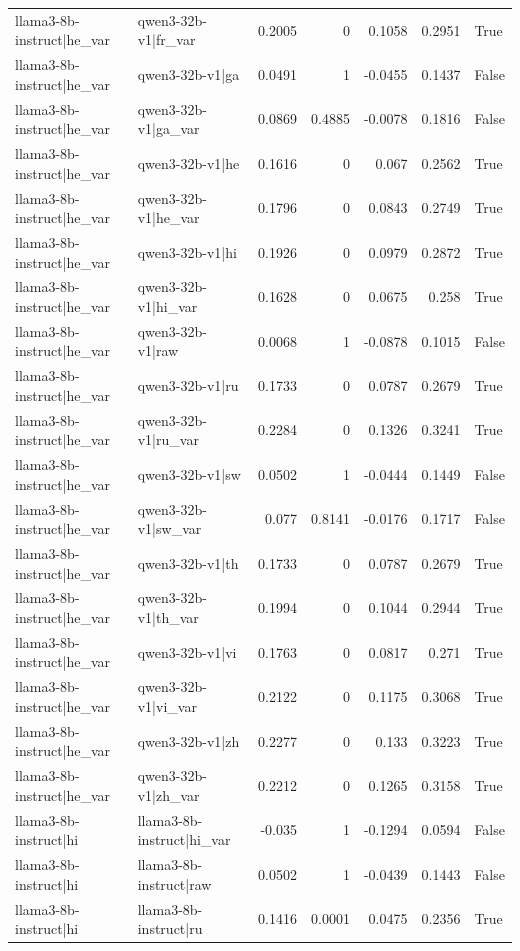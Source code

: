 \begin{table}
\begin{tabular}{l l r r r r l}
llama3-8b-instruct|he_var & qwen3-32b-v1|fr_var & 0.2005 & 0 & 0.1058 & 0.2951 & True \\
llama3-8b-instruct|he_var & qwen3-32b-v1|ga & 0.0491 & 1 & -0.0455 & 0.1437 & False \\
llama3-8b-instruct|he_var & qwen3-32b-v1|ga_var & 0.0869 & 0.4885 & -0.0078 & 0.1816 & False \\
llama3-8b-instruct|he_var & qwen3-32b-v1|he & 0.1616 & 0 & 0.067 & 0.2562 & True \\
llama3-8b-instruct|he_var & qwen3-32b-v1|he_var & 0.1796 & 0 & 0.0843 & 0.2749 & True \\
llama3-8b-instruct|he_var & qwen3-32b-v1|hi & 0.1926 & 0 & 0.0979 & 0.2872 & True \\
llama3-8b-instruct|he_var & qwen3-32b-v1|hi_var & 0.1628 & 0 & 0.0675 & 0.258 & True \\
llama3-8b-instruct|he_var & qwen3-32b-v1|raw & 0.0068 & 1 & -0.0878 & 0.1015 & False \\
llama3-8b-instruct|he_var & qwen3-32b-v1|ru & 0.1733 & 0 & 0.0787 & 0.2679 & True \\
llama3-8b-instruct|he_var & qwen3-32b-v1|ru_var & 0.2284 & 0 & 0.1326 & 0.3241 & True \\
llama3-8b-instruct|he_var & qwen3-32b-v1|sw & 0.0502 & 1 & -0.0444 & 0.1449 & False \\
llama3-8b-instruct|he_var & qwen3-32b-v1|sw_var & 0.077 & 0.8141 & -0.0176 & 0.1717 & False \\
llama3-8b-instruct|he_var & qwen3-32b-v1|th & 0.1733 & 0 & 0.0787 & 0.2679 & True \\
llama3-8b-instruct|he_var & qwen3-32b-v1|th_var & 0.1994 & 0 & 0.1044 & 0.2944 & True \\
llama3-8b-instruct|he_var & qwen3-32b-v1|vi & 0.1763 & 0 & 0.0817 & 0.271 & True \\
llama3-8b-instruct|he_var & qwen3-32b-v1|vi_var & 0.2122 & 0 & 0.1175 & 0.3068 & True \\
llama3-8b-instruct|he_var & qwen3-32b-v1|zh & 0.2277 & 0 & 0.133 & 0.3223 & True \\
llama3-8b-instruct|he_var & qwen3-32b-v1|zh_var & 0.2212 & 0 & 0.1265 & 0.3158 & True \\
llama3-8b-instruct|hi & llama3-8b-instruct|hi_var & -0.035 & 1 & -0.1294 & 0.0594 & False \\
llama3-8b-instruct|hi & llama3-8b-instruct|raw & 0.0502 & 1 & -0.0439 & 0.1443 & False \\
llama3-8b-instruct|hi & llama3-8b-instruct|ru & 0.1416 & 0.0001 & 0.0475 & 0.2356 & True \\

\end{tabular}
\end{table}
